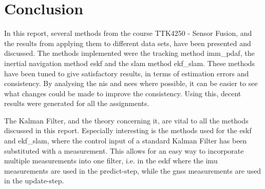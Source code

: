 \section{Conclusion}\label{sec:conclusion}
In this report, several methods from the course TTK4250 - Sensor Fusion, and the results from applying them to different data sets, have been presented and discussed. The methods implemented were the tracking method \acrshort{imm_pdaf}, the inertial navigation method \acrshort{eskf} and the \acrshort{slam} method \acrshort{ekf_slam}. These methods have been tuned to give satisfactory results, in terms of estimation errors and consistency. By analysing the \acrshort{nis} and \acrshort{nees} where possible, it can be easier to see what changes could be made to improve the consistency. Using this, decent results were generated for all the assignments. 

The Kalman Filter, and the theory concerning it, are vital to all the methods discussed in this report. Especially interesting is the methods used for the \acrshort{eskf} and \acrshort{ekf_slam}, where the control input of a standard Kalman Filter has been substituted with a measurement. This allows for an easy way to incorporate multiple measurements into one filter, i.e. in the \acrshort{eskf} where the \acrshort{imu} measurements are used in the predict-step, while the \acrshort{gnss} measurements are used in the update-step. 





